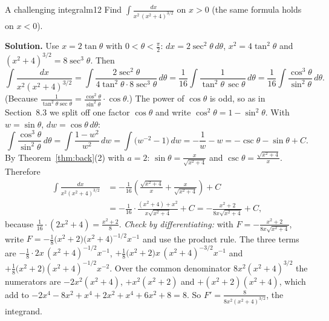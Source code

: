 \documentclass[11pt]{article}
\begin{document}
\begin{exmp}{A challenging integral}{m12}
Find $\displaystyle\int\frac{dx}{x^2\,(x^2+4)^{3/2}}$ on $x>0$ (the same formula holds on $x<0$).

\textbf{Solution.} Use $x=2\tan\theta$ with $0<\theta<\frac\pi2$: $dx=2\sec^2\theta\,d\theta$, $x^2=4\tan^2\theta$ and $(x^2+4)^{3/2}=8\sec^3\theta$. Then
\[\int\frac{dx}{x^2(x^2+4)^{3/2}}=\int\frac{2\sec^2\theta}{4\tan^2\theta\cdot8\sec^3\theta}\,d\theta=\frac1{16}\int\frac{1}{\tan^2\theta\,\sec\theta}\,d\theta=\frac1{16}\int\frac{\cos^3\theta}{\sin^2\theta}\,d\theta .\]
(Because $\frac1{\tan^2\theta\sec\theta}=\frac{\cos^2\theta}{\sin^2\theta}\cdot\cos\theta$.) The power of $\cos\theta$ is odd, so as in Section~8.3 we split off one factor $\cos\theta$ and write $\cos^2\theta=1-\sin^2\theta$. With $w=\sin\theta$, $dw=\cos\theta\,d\theta$:
\[\int\frac{\cos^3\theta}{\sin^2\theta}\,d\theta=\int\frac{1-w^2}{w^2}\,dw=\int\big(w^{-2}-1\big)\,dw=-\frac1w-w=-\csc\theta-\sin\theta+C .\]
By Theorem~\ref{thm:back}(2) with $a=2$: $\sin\theta=\frac x{\sqrt{x^2+4}}$ and $\csc\theta=\frac{\sqrt{x^2+4}}x$. Therefore
\begin{align*}
\int\frac{dx}{x^2(x^2+4)^{3/2}}&=-\frac1{16}\left(\frac{\sqrt{x^2+4}}x+\frac x{\sqrt{x^2+4}}\right)+C\\
&=-\frac1{16}\cdot\frac{(x^2+4)+x^2}{x\sqrt{x^2+4}}+C=-\frac{x^2+2}{8x\sqrt{x^2+4}}+C,
\end{align*}
because $\frac1{16}\cdot(2x^2+4)=\frac{x^2+2}8$. \emph{Check by differentiating:} with $F=-\frac{x^2+2}{8x\sqrt{x^2+4}}$, write $F=-\frac18\big(x^2+2\big)\big(x^2+4\big)^{-1/2}x^{-1}$ and use the product rule. The three terms are $-\frac18\cdot2x\,(x^2+4)^{-1/2}x^{-1}$, $+\frac18\big(x^2+2\big)x\,(x^2+4)^{-3/2}x^{-1}$ and $+\frac18\big(x^2+2\big)(x^2+4)^{-1/2}x^{-2}$. Over the common denominator $8x^2(x^2+4)^{3/2}$ the numerators are $-2x^2(x^2+4)$, $+x^2(x^2+2)$ and $+(x^2+2)(x^2+4)$, which add to $-2x^4-8x^2+x^4+2x^2+x^4+6x^2+8=8$. So $F'=\frac8{8x^2(x^2+4)^{3/2}}$, the integrand.
\end{exmp}
\end{document}
